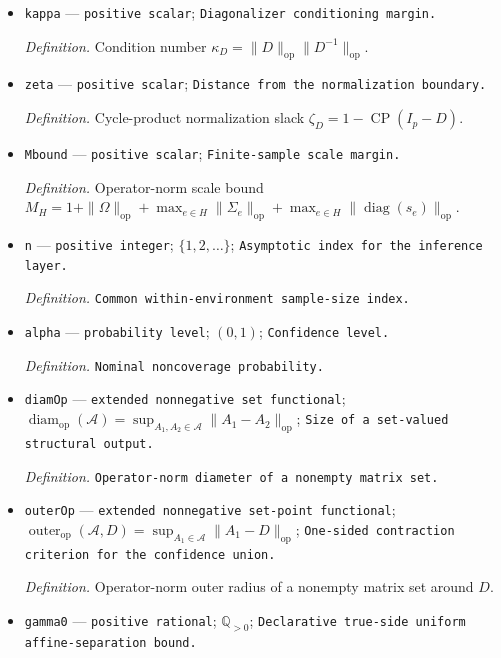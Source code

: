 \documentclass{article}
\begin{document}
\begin{itemize}
  \item \texttt{kappa} --- \texttt{positive scalar}; \texttt{Diagonalizer conditioning margin.}
  \par\smallskip\noindent\emph{Definition.} Condition number \(\kappa_D=\|D\|_{\mathrm{op}}\|D^{-1}\|_{\mathrm{op}}\).
  \item \texttt{zeta} --- \texttt{positive scalar}; \texttt{Distance from the normalization boundary.}
  \par\smallskip\noindent\emph{Definition.} Cycle-product normalization slack \(\zeta_D=1-\operatorname{CP}(I_p-D)\).
  \item \texttt{Mbound} --- \texttt{positive scalar}; \texttt{Finite-\allowbreak{}sample scale margin.}
  \par\smallskip\noindent\emph{Definition.} Operator-norm scale bound \(M_H=1+\|\Omega\|_{\mathrm{op}}+\max_{e\in H}\|\Sigma_e\|_{\mathrm{op}}+\max_{e\in H}\|\operatorname{diag}(s_e)\|_{\mathrm{op}}\).
  \item \texttt{n} --- \texttt{positive integer}; \(\{1,2,\ldots\}\); \texttt{Asymptotic index for the inference layer.}
  \par\smallskip\noindent\emph{Definition.} \texttt{Common within-\allowbreak{}environment sample-\allowbreak{}size index.}
  \item \texttt{alpha} --- \texttt{probability level}; \((0,1)\); \texttt{Confidence level.}
  \par\smallskip\noindent\emph{Definition.} \texttt{Nominal noncoverage probability.}
  \item \texttt{diamOp} --- \texttt{extended nonnegative set functional}; \(\operatorname{diam}_{\mathrm{op}}(\mathcal A)=\sup_{A_1,A_2\in\mathcal A}\|A_1-A_2\|_{\mathrm{op}}\); \texttt{Size of a set-\allowbreak{}valued structural output.}
  \par\smallskip\noindent\emph{Definition.} \texttt{Operator-\allowbreak{}norm diameter of a nonempty matrix set.}
  \item \texttt{outerOp} --- \texttt{extended nonnegative set-\allowbreak{}point functional}; \(\operatorname{outer}_{\mathrm{op}}(\mathcal A,D)=\sup_{A_1\in\mathcal A}\|A_1-D\|_{\mathrm{op}}\); \texttt{One-\allowbreak{}sided contraction criterion for the confidence union.}
  \par\smallskip\noindent\emph{Definition.} Operator-norm outer radius of a nonempty matrix set around \(D\).
  \item \texttt{gamma0} --- \texttt{positive rational}; \(\mathbb Q_{>0}\); \texttt{Declarative true-\allowbreak{}side uniform affine-\allowbreak{}separation bound.}

\end{itemize}
\end{document}
